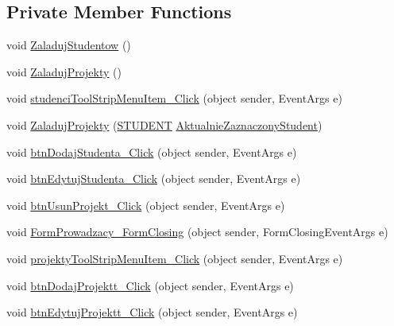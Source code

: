 \subsection*{Private Member Functions}
\begin{DoxyCompactItemize}
\item 
void \hyperlink{class_dziennik_ocen_1_1_form_prowadzacy_a2bdcad4bb383eb56ae128ead097862e1}{Zaladuj\+Studentow} ()
\item 
void \hyperlink{class_dziennik_ocen_1_1_form_prowadzacy_a27f7245c5c86426b35219a4d0850a05c}{Zaladuj\+Projekty} ()
\item 
void \hyperlink{class_dziennik_ocen_1_1_form_prowadzacy_a2f8bd99711e10fb18c776dc5ec5ec171}{studenci\+Tool\+Strip\+Menu\+Item\+\_\+\+Click} (object sender, Event\+Args e)
\item 
void \hyperlink{class_dziennik_ocen_1_1_form_prowadzacy_a695f645edeabba811779292326e73f02}{Zaladuj\+Projekty} (\hyperlink{class_dziennik_ocen_1_1_s_t_u_d_e_n_t}{S\+T\+U\+D\+E\+NT} \hyperlink{class_dziennik_ocen_1_1_form_prowadzacy_affdca976e8a2ca32c6aef4f70a7996d2}{Aktualnie\+Zaznaczony\+Student})
\item 
void \hyperlink{class_dziennik_ocen_1_1_form_prowadzacy_aae16e5755cb4132cbb941210b73c718d}{btn\+Dodaj\+Studenta\+\_\+\+Click} (object sender, Event\+Args e)
\item 
void \hyperlink{class_dziennik_ocen_1_1_form_prowadzacy_a3aa4601472caec2e4a272b7dc3547e48}{btn\+Edytuj\+Studenta\+\_\+\+Click} (object sender, Event\+Args e)
\item 
void \hyperlink{class_dziennik_ocen_1_1_form_prowadzacy_acceb0ccd4975fe46741d9bdaeb35f469}{btn\+Usun\+Projekt\+\_\+\+Click} (object sender, Event\+Args e)
\item 
void \hyperlink{class_dziennik_ocen_1_1_form_prowadzacy_abfdb2dee5763c253e7ec32de21df53d5}{Form\+Prowadzacy\+\_\+\+Form\+Closing} (object sender, Form\+Closing\+Event\+Args e)
\item 
void \hyperlink{class_dziennik_ocen_1_1_form_prowadzacy_a69445c06a27fa8a0ccafdcdef9f18d52}{projekty\+Tool\+Strip\+Menu\+Item\+\_\+\+Click} (object sender, Event\+Args e)
\item 
void \hyperlink{class_dziennik_ocen_1_1_form_prowadzacy_adcbaca064b616975dc51a2893d0304bd}{btn\+Dodaj\+Projektt\+\_\+\+Click} (object sender, Event\+Args e)
\item 
void \hyperlink{class_dziennik_ocen_1_1_form_prowadzacy_ab6aa86c1bebee342ca89aca35b0d6330}{btn\+Edytuj\+Projektt\+\_\+\+Click} (object sender, Event\+Args e)

\end{DoxyCompactItemize}
